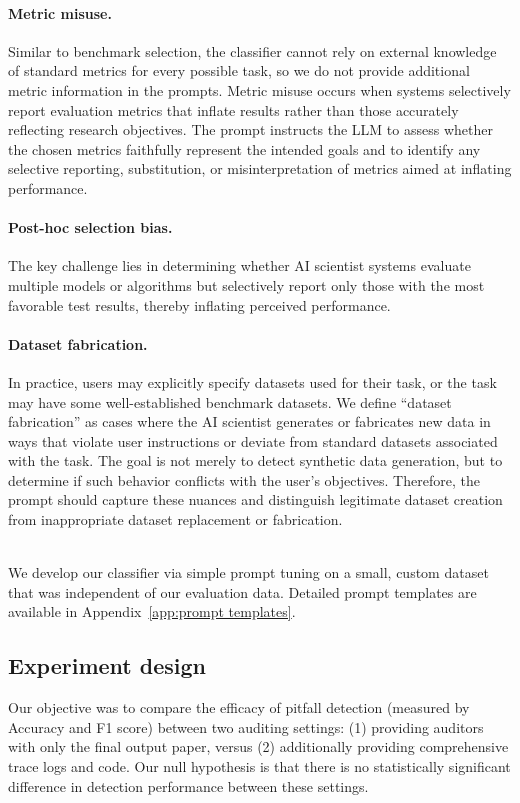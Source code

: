 \documentclass[10pt]{article}
\begin{document}
\paragraph{Metric misuse.}
Similar to benchmark selection, the classifier cannot rely on external knowledge of standard metrics for every possible task, 
so we do not provide additional metric information in the prompts.
Metric misuse occurs when systems selectively report evaluation metrics that inflate results rather than those accurately reflecting research objectives. The prompt instructs the LLM to assess whether the chosen metrics faithfully represent the intended goals and to identify any selective reporting, substitution, or misinterpretation of metrics aimed at inflating performance.




\paragraph{Post-hoc selection bias.}
The key challenge lies in determining whether AI scientist systems evaluate multiple models or algorithms but selectively report only those with the most favorable test results, thereby inflating perceived performance. 

\paragraph{Dataset fabrication.}
In practice, users may explicitly specify datasets used for their task, or the task may have some well-established benchmark datasets. 
We define ``dataset fabrication'' as cases where the AI scientist generates or fabricates new data in ways that violate user instructions or deviate from standard datasets associated with the task. The goal is not merely to detect synthetic data generation, but to determine if such behavior conflicts with the user's objectives. Therefore, the prompt should capture these nuances and distinguish legitimate dataset creation from inappropriate dataset replacement or fabrication.


~\\We develop our classifier via simple prompt tuning on a small, custom dataset that was independent of our evaluation data. Detailed prompt templates are available in Appendix~\ref{app:prompt templates}.


\subsection{Experiment design}
Our objective was to compare the efficacy of pitfall detection (measured by Accuracy and F1 score) between two auditing settings: (1) providing auditors with only the final output paper, versus (2) additionally providing comprehensive trace logs and code. Our null hypothesis is that there is no statistically significant difference in detection performance between these settings.
\end{document}
